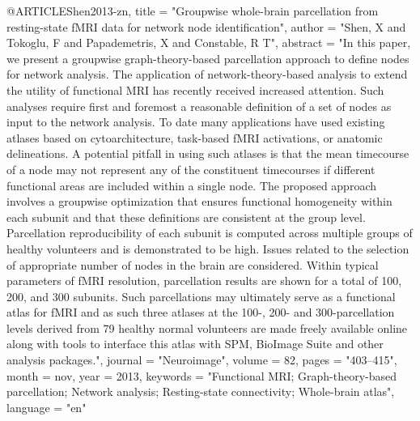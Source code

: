 
@ARTICLE{Shen2013-zn,
	title    = "Groupwise whole-brain parcellation from resting-state {fMRI} data
	for network node identification",
	author   = "Shen, X and Tokoglu, F and Papademetris, X and Constable, R T",
	abstract = "In this paper, we present a groupwise graph-theory-based
	parcellation approach to define nodes for network analysis. The
	application of network-theory-based analysis to extend the
	utility of functional MRI has recently received increased
	attention. Such analyses require first and foremost a reasonable
	definition of a set of nodes as input to the network analysis. To
	date many applications have used existing atlases based on
	cytoarchitecture, task-based fMRI activations, or anatomic
	delineations. A potential pitfall in using such atlases is that
	the mean timecourse of a node may not represent any of the
	constituent timecourses if different functional areas are
	included within a single node. The proposed approach involves a
	groupwise optimization that ensures functional homogeneity within
	each subunit and that these definitions are consistent at the
	group level. Parcellation reproducibility of each subunit is
	computed across multiple groups of healthy volunteers and is
	demonstrated to be high. Issues related to the selection of
	appropriate number of nodes in the brain are considered. Within
	typical parameters of fMRI resolution, parcellation results are
	shown for a total of 100, 200, and 300 subunits. Such
	parcellations may ultimately serve as a functional atlas for fMRI
	and as such three atlases at the 100-, 200- and 300-parcellation
	levels derived from 79 healthy normal volunteers are made freely
	available online along with tools to interface this atlas with
	SPM, BioImage Suite and other analysis packages.",
	journal  = "Neuroimage",
	volume   =  82,
	pages    = "403--415",
	month    =  nov,
	year     =  2013,
	keywords = "Functional MRI; Graph-theory-based parcellation; Network
	analysis; Resting-state connectivity; Whole-brain atlas",
	language = "en"
}

